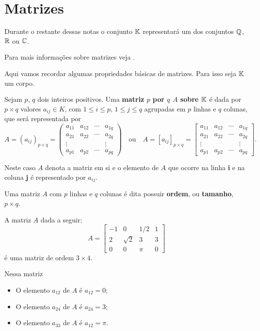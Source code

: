 \section{Matrizes}

Durante o restante dessas notas o conjunto $\mathbb{K}$ representará um dos conjuntos $\mathbb{Q}$, $\mathbb{R}$ ou $\mathbb{C}$.

Para mais informações sobre matrizes veja \cite{Boldrini:1980, Callioli:2009, Anton:2012}.

Aqui vamos recordar algumas propriedades básicas de matrizes. Para isso seja $\mathbb{K}$ um corpo.

Sejam $p$, $q$ dois inteiros positivos. Uma \textbf{matriz $p$ por $q$ $A$ sobre $\mathbb{K}$} é dada por $p \times q$ valores $a_{ij} \in K$, com $1 \le i \le p$, $1 \le j \le q$ agrupadas em $p$ linhas e $q$ colunas, que será representada por
\[
	A = (a_{ij})_{p\times q} = \begin{pmatrix}
		a_{11} & a_{12} & \cdots & a_{1q}\\
		a_{21} & a_{22} & \cdots & a_{2q}\\
		\vdots & & & \vdots\\
		a_{p1} & a_{p2} & \cdots & a_{pq}
	\end{pmatrix} \quad\mbox{ou}\quad
	A = [a_{ij}]_{p\times q} = \begin{bmatrix}
		a_{11} & a_{12} & \cdots & a_{1q}\\
		a_{21} & a_{22} & \cdots & a_{2q}\\
		\vdots & & & \vdots\\
		a_{p1} & a_{p2} & \cdots & a_{pq}
	\end{bmatrix}.
\]

Neste caso $A$ denota a matriz em si e o elemento de $A$ que ocorre na linha \textbf{i} e na coluna \textbf{j} é representado por $a_{ij}$.

Uma matriz $A$ com $p$ linhas e $q$ colunas é dita possuir \textbf{ordem}, ou \textbf{tamanho}, $p\times q$.

\begin{exemplo}
	A matriz $A$ dada a seguir:
	\[
		A = \begin{bmatrix}
			-1 & 0 & 1/2 & 1\\
			2 & \sqrt{2} & 3 & 3\\
			0 & 0 & \pi & 0
		\end{bmatrix}
	\]
	é uma matriz de ordem $3 \times 4$.

	Nessa matriz
	\begin{itemize}
		\item O elemento $a_{12}$ de $A$ é $a_{12} = 0$;

		\item O elemento $a_{24}$ de $A$ é $a_{24} = 3$;

		\item O elemento $a_{33}$ de $A$ é $a_{12} = \pi$.
	\end{itemize}
\end{exemplo}

